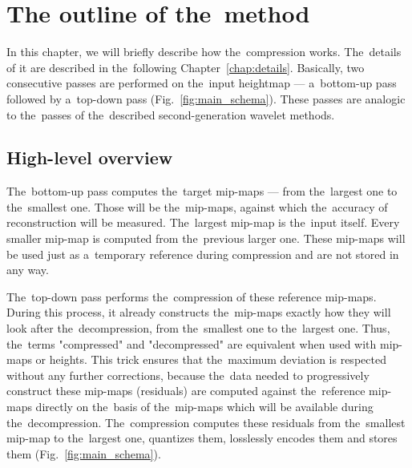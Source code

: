 \chapter{The outline of the~method}\label{chap:outline}

\newcommand{\objnorm}[2]{\mathbold{#1_{#2}}}
\newcommand{\objdot}[2]{\mathbold{#1_{#2}^\bullet}}
\newcommand{\lnorm}[1]{\objnorm{L}{#1}}
\newcommand{\ldot}[1]{\mathbold{L_{#1}^\bullet}}

\newcommand{\opnorm}[2]{\mathit{#1_{#2}}}
\newcommand{\dnorm}{\opnorm{Q}{D}}

In this chapter, we will briefly describe how the~compression works. The~details of it are described in the~following Chapter~\ref{chap:details}. Basically, two consecutive passes are performed on the~input heightmap --- a~bottom-up pass followed by a~top-down pass (Fig.~\ref{fig:main_schema}). These passes are analogic to the~passes of the~described second-generation wavelet methods. 

\section{High-level overview}
	
The~bottom-up pass computes the~target mip-maps --- from the~largest one to the~smallest one. Those will be the~mip-maps, against which the~accuracy of reconstruction will be measured. The~largest mip-map is the~input itself. Every smaller mip-map is computed from the~previous larger one. These mip-maps will be used just as a~temporary reference during compression and are not stored in any way.

The~top-down pass performs the~compression of these reference mip-maps. During this process, it already constructs the~mip-maps exactly how they will look after the~decompression, from the~smallest one to the~largest one. Thus, the~terms "compressed" and "decompressed" are equivalent when used with mip-maps or heights. This trick ensures that the~maximum deviation is respected without any further corrections, because the~data needed to progressively construct these mip-maps (residuals) are computed against the~reference mip-maps directly on the~basis of the~mip-maps which will be available during the~decompression. The~compression computes these residuals from the~smallest mip-map to the~largest one, quantizes them, losslessly encodes them and stores them (Fig.~\ref{fig:main_schema}).

